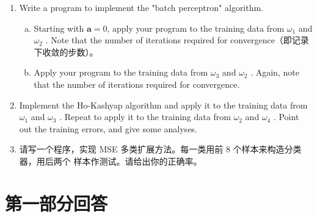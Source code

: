 \documentclass[a4paper,11pt,onecolumn,oneside,UTF8]{article}
\begin{document}
\begin{enumerate}
    \item Write a program to implement the "{\color{blue}batch perceptron}" algorithm.
          \begin{enumerate}[(a).]
              \item Starting with $\bm a = 0$, apply your program to the training data from $\omega_1$ and $\omega_2$ . Note that the
                    number of iterations required for convergence（即记录下收敛的步数）。
              \item Apply your program to the training data from $\omega_3$ and $\omega_2$ . Again, note that the number of
                    iterations required for convergence.
          \end{enumerate}
    \item Implement the {\color{blue} Ho-Kashyap algorithm} and apply it to the training data from $\omega_1$ and $\omega_3$ .
          Repeat to apply it to the training data from $\omega_2$ and $\omega_4$ . Point out the training errors, and give
          some analyses.
    \item 请写一个程序，实现 {\color{blue}MSE 多类扩展方法}。每一类用前 8 个样本来构造分类器，用后两个
          样本作测试。请给出你的正确率。
\end{enumerate}

\section*{第一部分回答}
\end{document}
